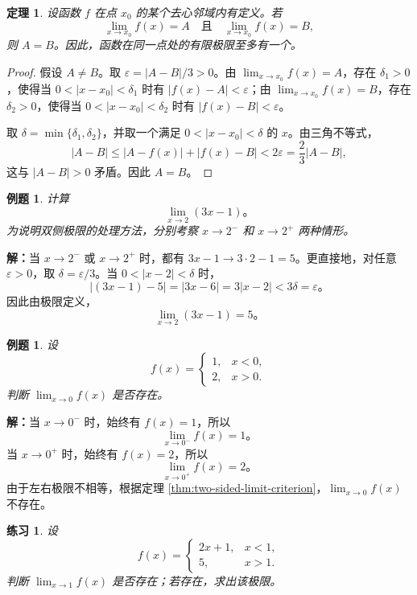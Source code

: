 \documentclass[UTF8,fontset=fandol,11pt]{ctexart}
\newtheorem{theorem}[definition]{定理}
\newtheorem{example}[definition]{例题}
\newtheorem{exercise}[definition]{练习}
\begin{document}
\begin{theorem}
设函数 $f$ 在点 $x_0$ 的某个去心邻域内有定义。若
\[
\lim_{x\to x_0}f(x)=A
\quad\text{且}\quad
\lim_{x\to x_0}f(x)=B,
\]
则 $A=B$。因此，函数在同一点处的有限极限至多有一个。\label{thm:limit-uniqueness}
\end{theorem}
\begin{proof}
假设 $A\ne B$。取 $\varepsilon=|A-B|/3>0$。由 $\lim_{x\to x_0}f(x)=A$，存在 $\delta_1>0$，使得当 $0<|x-x_0|<\delta_1$ 时有 $|f(x)-A|<\varepsilon$；由 $\lim_{x\to x_0}f(x)=B$，存在 $\delta_2>0$，使得当 $0<|x-x_0|<\delta_2$ 时有 $|f(x)-B|<\varepsilon$。

取 $\delta=\min\{\delta_1,\delta_2\}$，并取一个满足 $0<|x-x_0|<\delta$ 的 $x$。由三角不等式，
\[
|A-B|\leq |A-f(x)|+|f(x)-B|<2\varepsilon=\frac{2}{3}|A-B|,
\]
这与 $|A-B|>0$ 矛盾。因此 $A=B$。
\end{proof}
\begin{example}
计算
\[
\lim_{x\to2}(3x-1)\text{。}
\]
为说明双侧极限的处理方法，分别考察 $x\to2^-$ 和 $x\to2^+$ 两种情形。
\end{example}
\par\noindent\textbf{解：}当 $x\to2^-$ 或 $x\to2^+$ 时，都有 $3x-1\to3\cdot2-1=5$。更直接地，对任意 $\varepsilon>0$，取 $\delta=\varepsilon/3$。当 $0<|x-2|<\delta$ 时，
\[
|(3x-1)-5|=|3x-6|=3|x-2|<3\delta=\varepsilon\text{。}
\]
因此由极限定义，
\[
\lim_{x\to2}(3x-1)=5\text{。}
\]\par
\begin{example}
设
\[
f(x)=
\begin{cases}
1,&x<0,\\
2,&x>0.
\end{cases}
\]
判断 $\lim_{x\to0}f(x)$ 是否存在。
\end{example}
\par\noindent\textbf{解：}当 $x\to0^-$ 时，始终有 $f(x)=1$，所以
\[
\lim_{x\to0^-}f(x)=1\text{。}
\]
当 $x\to0^+$ 时，始终有 $f(x)=2$，所以
\[
\lim_{x\to0^+}f(x)=2\text{。}
\]
由于左右极限不相等，根据定理 \ref{thm:two-sided-limit-criterion}，$\lim_{x\to0}f(x)$ 不存在。\par
\begin{exercise}
\label{mathagent:exercise:bf60311c135cf0c14f3cb42069a931ed175758be7d89dff861bed83a8d332803}
设
\[
f(x)=
\begin{cases}
2x+1,&x<1,\\
5,&x>1.
\end{cases}
\]
判断 $\lim_{x\to1}f(x)$ 是否存在；若存在，求出该极限。
\end{exercise}
\end{document}
